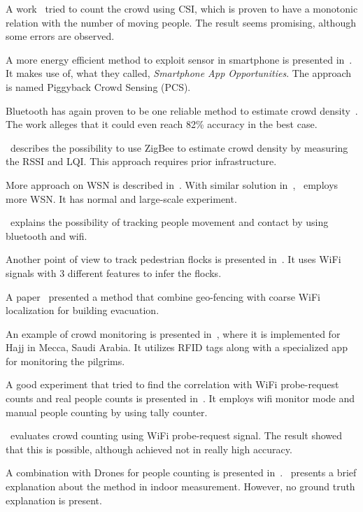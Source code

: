A work~\cite{thesis006} tried to count the crowd using CSI, which is proven to have a monotonic relation with the number of moving people. The result seems promising, although some errors are observed.

A more energy efficient method to exploit sensor in smartphone is presented in~\cite{thesis040}. It makes use of, what they called, \textit{Smartphone App Opportunities}. The approach is named Piggyback Crowd Sensing (PCS).

Bluetooth has again proven to be one reliable method to estimate crowd density~\cite{thesis041}. The work alleges that it could even reach 82\% accuracy in the best case.

\cite{thesis042}~describes the possibility to use ZigBee to estimate crowd density by measuring the RSSI and LQI. This approach requires prior infrastructure.

More approach on WSN is described in~\cite{thesis043}. With similar solution in~\cite{thesis042},~\cite{thesis043} employs more WSN. It has normal and large-scale experiment.

\cite{thesis022}~explains the possibility of tracking people movement and contact by using bluetooth and wifi.

Another point of view to track pedestrian flocks is presented in~\cite{thesis033}. It uses WiFi signals with 3 different features to infer the flocks.

A paper~\cite{thesis045} presented a method that combine geo-fencing with coarse WiFi localization for building evacuation.

An example of crowd monitoring is presented in~\cite{thesis050}, where it is implemented for Hajj in Mecca, Saudi Arabia. It utilizes RFID tags along with a specialized app for monitoring the pilgrims.

A good experiment that tried to find the correlation with WiFi probe-request counts and real people counts is presented in~\cite{thesis047}. It employs wifi monitor mode and manual people counting by using tally counter.

\cite{thesis057}~evaluates crowd counting using WiFi probe-request signal. The result showed that this is possible, although achieved not in really high accuracy.

A combination with Drones for people counting is presented in~\cite{thesis053}. \cite{thesis060}~presents a brief explanation about the method in indoor measurement. However, no ground truth explanation is present.

